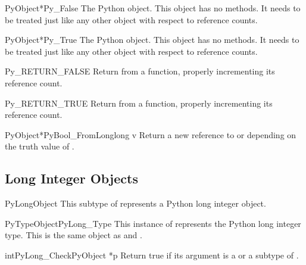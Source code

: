 \begin{cvardesc}{PyObject*}{Py_False}
  The Python  object.  This object has no methods.  It needs to
  be treated just like any other object with respect to reference counts.
\end{cvardesc}

\begin{cvardesc}{PyObject*}{Py_True}
  The Python  object.  This object has no methods.  It needs to
  be treated just like any other object with respect to reference counts.
\end{cvardesc}

\begin{csimplemacrodesc}{Py_RETURN_FALSE}
  Return  from a function, properly incrementing its
  reference count.
\end{csimplemacrodesc}

\begin{csimplemacrodesc}{Py_RETURN_TRUE}
  Return  from a function, properly incrementing its
  reference count.
\end{csimplemacrodesc}

\begin{cfuncdesc}{PyObject*}{PyBool_FromLong}{long v}
  Return a new reference to  or 
  depending on the truth value of .
\end{cfuncdesc}

\subsection{Long Integer Objects \label{longObjects}}

\begin{ctypedesc}{PyLongObject}
  This subtype of  represents a Python long integer
  object.
\end{ctypedesc}

\begin{cvardesc}{PyTypeObject}{PyLong_Type}
  This instance of  represents the Python long
  integer type.  This is the same object as  and
  .
\end{cvardesc}

\begin{cfuncdesc}{int}{PyLong_Check}{PyObject *p}
  Return true if its argument is a  or a subtype
  of .
\end{cfuncdesc}

